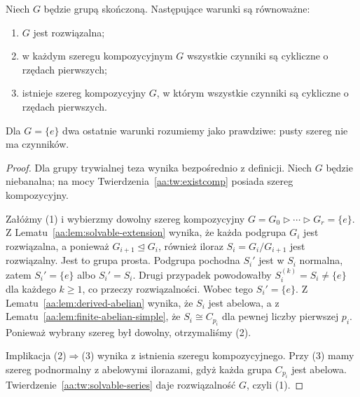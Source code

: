 \begin{twierdzenie}
\label{aa:tw:solvable-composition-factors}
Niech $G$ będzie grupą skończoną. Następujące warunki są
równoważne:
\begin{enumerate}
\item $G$ jest rozwiązalna;
\item w każdym szeregu kompozycyjnym $G$ wszystkie czynniki
są cykliczne o rzędach pierwszych;
\item istnieje szereg kompozycyjny $G$, w którym wszystkie
czynniki są cykliczne o rzędach pierwszych.
\end{enumerate}
Dla $G=\{e\}$ dwa ostatnie warunki rozumiemy jako prawdziwe:
pusty szereg nie ma czynników.
\end{twierdzenie}
\begin{proof}
Dla grupy trywialnej teza wynika bezpośrednio z definicji.
Niech $G$ będzie niebanalna; na mocy
Twierdzenia~\ref{aa:tw:existcomp} posiada szereg kompozycyjny.

Załóżmy (1) i wybierzmy dowolny szereg kompozycyjny
$G=G_0\triangleright\cdots\triangleright G_r=\{e\}$.
Z Lematu~\ref{aa:lem:solvable-extension} wynika, że
każda podgrupa $G_i$ jest rozwiązalna, a ponieważ
$G_{i+1}\trianglelefteq G_i$, również iloraz
$S_i=G_i/G_{i+1}$ jest rozwiązalny. Jest to grupa prosta.
Podgrupa pochodna $S_i'$ jest w $S_i$ normalna, zatem
$S_i'=\{e\}$ albo $S_i'=S_i$. Drugi przypadek
powodowałby $S_i^{(k)}=S_i\ne\{e\}$ dla każdego $k\ge1$,
co przeczy rozwiązalności. Wobec tego $S_i'=\{e\}$.
Z Lematu~\ref{aa:lem:derived-abelian} wynika, że
$S_i$ jest abelowa, a z
Lematu~\ref{aa:lem:finite-abelian-simple}, że $S_i\cong C_{p_i}$
dla pewnej liczby pierwszej $p_i$. Ponieważ wybrany szereg
był dowolny, otrzymaliśmy (2).

Implikacja (2)$\Rightarrow$(3) wynika z istnienia
szeregu kompozycyjnego. Przy (3) mamy szereg podnormalny
z abelowymi ilorazami, gdyż każda grupa $C_{p_i}$
jest abelowa. Twierdzenie~\ref{aa:tw:solvable-series}
daje rozwiązalność $G$, czyli (1).
\end{proof}

